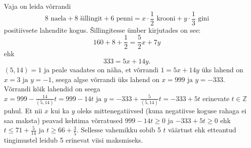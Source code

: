 \documentclass[a4paper, 10pt]{article}
\begin{document}
\bigskip
Vaja on leida võrrandi $$8\text{ naela} + 8\text{ šillingit}+6\text{ penni}=x\cdot\frac12\text{ krooni}+y\cdot\frac13\text{ gini}$$ positiivsete lahendite kogus. Šillingitesse ümber kirjutades on see: $$160+8+\frac12=\frac52x+7y$$ ehk $$333=5x+14y.$$ $(5,14)=1$ ja peale vaadates on näha, et võrrandi $1=5x+14y$ üks lahend on $x=3\text{ ja }y=-1$, seega algse võrrandi üks lahend on $x=999\text{ ja }y=-333$. Võrrandi kõik lahendid on seega $x=999-\frac{14}{(5,14)}t=999-14t\text{ ja }y=-333+\frac{5}{(5,14)}t=-333+5t$ erinevate $t\in\mathbb{Z}$ puhul. Et nii $x$ kui ka $y$ oleks mittenegatiivsed (kuna negatiivse koguse rahaga ei saa maksta) peavad kehtima võrratused $999-14t\geq0$ ja $-333+5t\geq0$ ehk $t\leq71+\frac5{14}$ ja $t\geq 66+\frac35$. Sellesse vahemikku sobib 5 $t$ väärtust ehk etteantud tingimustel leidub 5 erinevat viisi maksmiseks.
\bigskip
\end{document}
